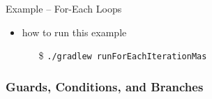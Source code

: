 \documentclass[presentation]{beamer}\mode<presentation>{\usetheme{AMSBolognaFC}}
\begin{document}
\begin{frame}[c, allowframebreaks]{Example \theJasonExample{} -- For-Each Loops}
\begin{itemize}
        \vspace{.3cm}
        
        \item how to run this example
        \begin{itemize}
            \item[\$] \texttt{./gradlew run\alert{ForEachIteration}Mas}
        \end{itemize}
        
    \end{itemize}
\end{frame}

\subsubsection{Guards, Conditions, and Branches}
\end{document}
